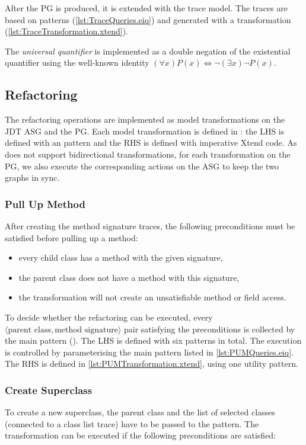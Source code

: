 \documentclass[submission,copyright,creativecommons]{eptcs}
\begin{document}
After the PG is produced, it is extended with the trace model. The traces are based on \eiq patterns (\autoref{lst:TraceQueries.eiq}) and generated with a \viatra transformation (\autoref{lst:TraceTransformation.xtend}).

The \emph{universal quantifier} is implemented as a double negation of the existential quantifier using the well-known identity $(\forall x) P(x) \Leftrightarrow \neg (\exists x) \neg P(x)$.

\subsection[Refactoring]{Refactoring\qquad{}}

The refactoring operations are implemented as model transformations on the JDT ASG and the PG. Each model transformation is defined in \viatra: the LHS is defined with an \eiq pattern and the RHS is defined with imperative Xtend code. As \viatra does not support bidirectional transformations, for each transformation on the PG, we also execute the corresponding actions on the ASG to keep the two graphs in sync.

\subsubsection{Pull Up Method}
After creating the method signature traces, the following preconditions must be satisfied before pulling up a method:

\begin{itemize}[noitemsep]
	 \item every child class has a method with the given signature,
	 \item the parent class does not have a method with this signature,
	 \item the transformation will not create an unsatisfiable method or field access.
\end{itemize}

To decide whether the refactoring can be executed, every $\langle \text{parent class}, \text{method signature} \rangle$ pair satisfying the preconditions is collected by the main pattern (). The LHS is defined with six patterns in total. The execution is controlled by parameterising the main pattern listed in \autoref{lst:PUMQueries.eiq}. The RHS is defined in \autoref{lst:PUMTransformation.xtend}, using one utility pattern.

\subsubsection{Create Superclass}
To create a new superclass, the parent class and the list of selected classes (connected to a class list trace) have to be passed to the pattern. The transformation can be executed if the following preconditions are satisfied:
\end{document}
